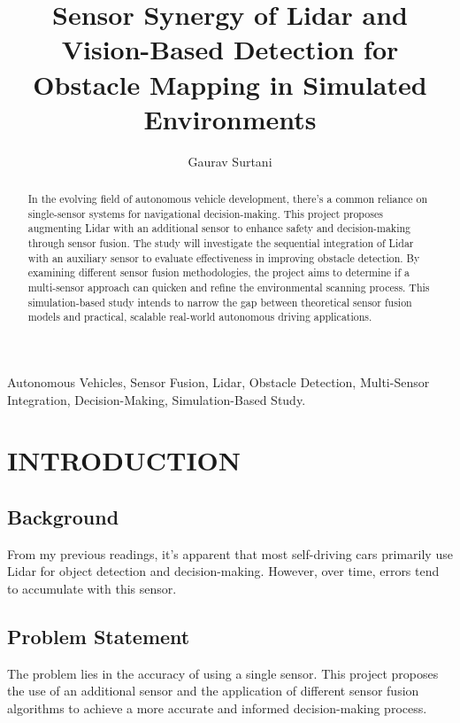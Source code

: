 \documentclass[letterpaper, 10 pt, conference]{ieeeconf}  %
\title{\LARGE \bf
Sensor Synergy of Lidar and Vision-Based Detection for Obstacle Mapping in Simulated Environments
}
\author{Gaurav Surtani}
\begin{document}
\maketitle
\thispagestyle{empty}
\pagestyle{empty}


\begin{abstract}

In the evolving field of autonomous vehicle development, there's a common reliance on single-sensor systems for navigational decision-making. This project proposes augmenting Lidar with an additional sensor to enhance safety and decision-making through sensor fusion. The study will investigate the sequential integration of Lidar with an auxiliary sensor to evaluate effectiveness in improving obstacle detection. By examining different sensor fusion methodologies, the project aims to determine if a multi-sensor approach can quicken and refine the environmental scanning process. This simulation-based study intends to narrow the gap between theoretical sensor fusion models and practical, scalable real-world autonomous driving applications.

\end{abstract}

\begin{keywords}
Autonomous Vehicles, Sensor Fusion, Lidar, Obstacle Detection, Multi-Sensor Integration, Decision-Making, Simulation-Based Study.
\end{keywords}


\section{INTRODUCTION}

\subsection{Background}
From my previous readings, it's apparent that most self-driving cars primarily use Lidar for object detection and decision-making. However, over time, errors tend to accumulate with this sensor.

\subsection{Problem Statement}   
The problem lies in the accuracy of using a single sensor. This project proposes the use of an additional sensor and the application of different sensor fusion algorithms to achieve a more accurate and informed decision-making process.
\end{document}
